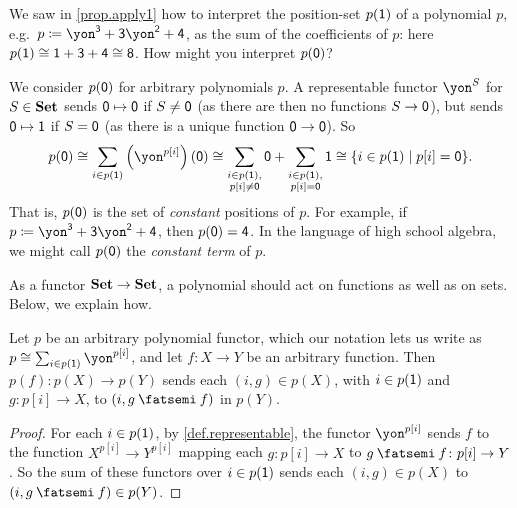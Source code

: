 \documentclass[Book-Poly]{subfiles}
\begin{document}
\begin{exercise}\label{exc.apply0}
    We saw in \cref{prop.apply1} how to interpret the position-set $p(\textsf{1})$ of a polynomial $p$, e.g.\ $p\coloneqq\yon^\3+\3\yon^\2+\4$, as the sum of the coefficients of $p$: here $p(\textsf{1})\cong\textsf{1}+\textsf{3}+\textsf{4}\cong\textsf{8}$.
    How might you interpret $p(\textsf{0})$?
    \begin{solution}
        We consider $p(\textsf{0})$ for arbitrary polynomials $p$.
        A representable functor $\yon^S$ for $S\in\mathbf{Set}$ sends $\textsf{0}\mapsto\textsf{0}$ if $S\neq\textsf{0}$ (as there are then no functions $S\to\textsf{0}$), but sends $\textsf{0}\mapsto\textsf{1}$ if $S=\textsf{0}$ (as there is a unique function $\textsf{0}\to\textsf{0}$).
        So
        \[
        p(\0)\iso\sum_{i\in p(\1)}\left(\yon^{p[i]}\right)(\0)\iso\sum_{\substack{i\in p(\1),\\ p[i]\neq\0}}\0+\sum_{\substack{i\in p(\1),\\ p[i]=\0}}\1\iso\{i\in p(\1)\mid p[i]=\0\}.
        \]
        That is, $p(\textsf{0})$ is the set of \emph{constant} positions of $p$.
        For example, if $p\coloneqq\yon^\3+\3\yon^\2+\4$, then $p(\textsf{0})=\textsf{4}$.
        In the language of high school algebra, we might call $p(\textsf{0})$ the \emph{constant term} of $p$.
    \end{solution}
\end{exercise}

As a functor $\mathbf{Set}\to\mathbf{Set}$, a polynomial should act on functions as well as on sets.
Below, we explain how.

\begin{proposition} \label{prop.poly_on_functions}
    Let $p$ be an arbitrary polynomial functor, which our notation lets us write as $p\iso\sum_{i\in p(\1)} \yon^{p[i]}$, and let $f\colon X\to Y$ be an arbitrary function.
    Then $p(f)\colon p(X)\to p(Y)$ sends each $(i, g)\in p(X)$, with $i\in p(\textsf{1})$ and $g\colon p[i]\to X$, to $(i, g\then f)$ in $p(Y)$.
\end{proposition}
\begin{proof}
    For each $i\in p(\textsf{1})$, by \cref{def.representable}, the functor $\yon^{p[i]}$ sends $f$ to the function $X^{p[i]}\to Y^{p[i]}$ mapping each $g\colon p[i]\to X$ to $g\then f\colon p[i]\to Y$.
    So the sum of these functors over $i\in p(\textsf{1})$ sends each $(i, g)\in p(X)$ to $(i, g\then f)\in p(Y)$.
\end{proof}
\end{document}

